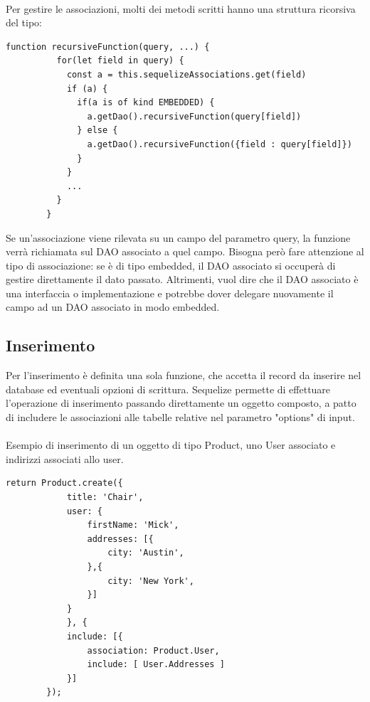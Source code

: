 \documentclass[a4paper, 12pt]{report}
\begin{document}
      \paragraph*{}
      Per gestire le associazioni, molti dei metodi scritti hanno una struttura ricorsiva del tipo:
      \begin{Verbatim}[samepage=true]
        function recursiveFunction(query, ...) {
          for(let field in query) {
            const a = this.sequelizeAssociations.get(field)
            if (a) {
              if(a is of kind EMBEDDED) {
                a.getDao().recursiveFunction(query[field])
              } else {
                a.getDao().recursiveFunction({field : query[field]})
              }
            }
            ...
          }
        }
      \end{Verbatim}
      Se un'associazione viene rilevata su un campo del parametro query, la funzione verrà richiamata sul DAO associato a quel campo. 
      Bisogna però fare attenzione al tipo di associazione: se è di tipo embedded, il DAO associato si occuperà di gestire direttamente il dato passato. Altrimenti, vuol dire che il DAO associato è una interfaccia o implementazione e potrebbe dover
      delegare nuovamente il campo ad un DAO associato in modo embedded.
    \newpage
    \subsection{Inserimento}
      Per l'inserimento è definita una sola funzione, che accetta il record da inserire nel database ed eventuali opzioni di scrittura.
      Sequelize permette di effettuare l'operazione di inserimento passando direttamente un oggetto composto, a patto di includere le associazioni alle tabelle relative
      nel parametro "options" di input.
      \paragraph*{}
      Esempio di inserimento di un oggetto di tipo Product, uno User associato e indirizzi associati allo user.
      \begin{Verbatim}[samepage=true]
        return Product.create({
            title: 'Chair',
            user: {
                firstName: 'Mick',
                addresses: [{
                    city: 'Austin',
                },{
                    city: 'New York',
                }]
            }
            }, {
            include: [{
                association: Product.User,
                include: [ User.Addresses ]
            }]
        });
      \end{Verbatim}
\end{document}
